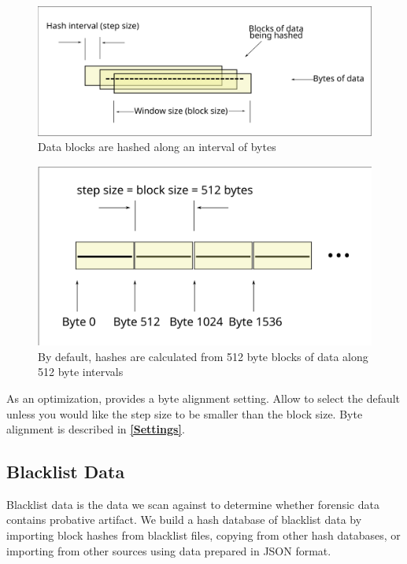 \documentclass[11pt,fleqn]{article} %
\begin{document}
\begin{figure}
	\center
	\includegraphics[scale=.45]{drawings/hash_interval}
	\caption{Data blocks are hashed along an interval of bytes}
	\label{fig:hashInterval}
\end{figure}

\begin{figure}
	\center
	\includegraphics[scale=.45]{drawings/default_hash_interval}
	\caption{By default, hashes are calculated from 512 byte blocks of data along 512 byte intervals}
	\label{fig:defaultHashInterval}
\end{figure}

As an optimization, \hdb provides a byte alignment setting. Allow \hdb to select the default unless you would like the step size to be smaller than the block size. Byte alignment is described in \textbf{\autoref{Settings}}.

\subsection{Blacklist Data}
Blacklist data is the data we scan against to determine whether forensic data
contains probative artifact.
We build a hash database of blacklist data by importing block hashes
from blacklist files, copying from other hash databases,
or importing from other sources using data prepared in JSON format.\\
\end{document}
